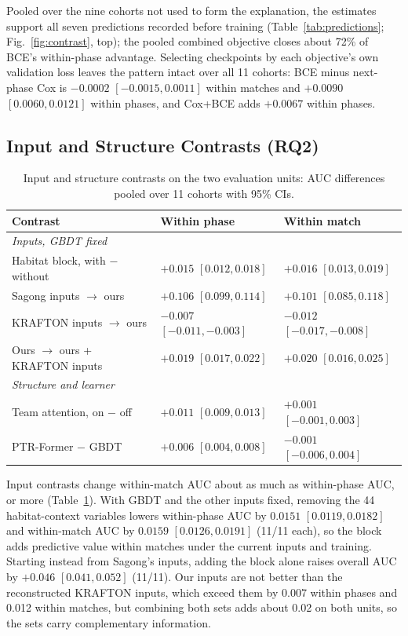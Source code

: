 \documentclass[sigconf,anonymous,nonacm]{acmart}
\begin{document}

Pooled over the nine cohorts not used to form the explanation, the estimates support all seven predictions recorded before training (Table~\ref{tab:predictions}; Fig.~\ref{fig:contrast}, top); the pooled combined objective closes about 72\% of BCE's within-phase advantage. Selecting checkpoints by each objective's own validation loss leaves the pattern intact over all 11 cohorts: BCE minus next-phase Cox is $-0.0002$ $[-0.0015,\allowbreak 0.0011]$ within matches and $+0.0090$ $[0.0060,\allowbreak 0.0121]$ within phases, and Cox+BCE adds $+0.0067$ within phases.

\subsection{Input and Structure Contrasts (RQ2)}
\label{sec:results:inputs}
\begin{table}[t]
\centering\scriptsize
\caption{Input and structure contrasts on the two evaluation units: AUC differences pooled over 11 cohorts with 95\% CIs.}
\label{tab:contrasts}
\setlength{\tabcolsep}{2.5pt}
\begin{tabular}{lll}
\toprule
Contrast & Within phase & Within match \\
\midrule
\multicolumn{3}{l}{\emph{Inputs, GBDT fixed}} \\
Habitat block, with $-$ without & $+0.015$ $[0.012, 0.018]$ & $+0.016$ $[0.013, 0.019]$ \\
Sagong inputs $\to$ ours & $+0.106$ $[0.099, 0.114]$ & $+0.101$ $[0.085, 0.118]$ \\
KRAFTON inputs $\to$ ours & $-0.007$ $[-0.011, -0.003]$ & $-0.012$ $[-0.017, -0.008]$ \\
Ours $\to$ ours + KRAFTON inputs & $+0.019$ $[0.017, 0.022]$ & $+0.020$ $[0.016, 0.025]$ \\
\midrule
\multicolumn{3}{l}{\emph{Structure and learner}} \\
Team attention, on $-$ off & $+0.011$ $[0.009, 0.013]$ & $+0.001$ $[-0.001, 0.003]$ \\
PTR-Former $-$ GBDT & $+0.006$ $[0.004, 0.008]$ & $-0.001$ $[-0.006, 0.004]$ \\
\bottomrule
\end{tabular}
\end{table}
Input contrasts change within-match AUC about as much as within-phase AUC, or more (Table~\ref{tab:contrasts}). With GBDT and the other inputs fixed, removing the 44 habitat-context variables lowers within-phase AUC by $0.0151$ $[0.0119,\allowbreak 0.0182]$ and within-match AUC by $0.0159$ $[0.0126,\allowbreak 0.0191]$ (11/11 each), so the block adds predictive value within matches under the current inputs and training. Starting instead from Sagong's inputs, adding the block alone raises overall AUC by $+0.046$ $[0.041,\allowbreak 0.052]$ (11/11). Our inputs are not better than the reconstructed KRAFTON inputs, which exceed them by 0.007 within phases and 0.012 within matches, but combining both sets adds about 0.02 on both units, so the sets carry complementary information.
\end{document}
